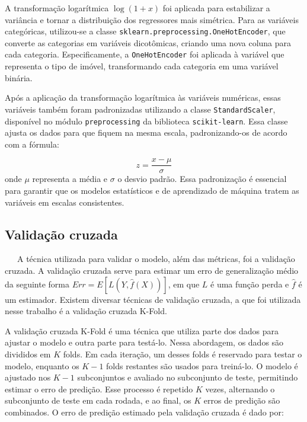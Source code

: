 \documentclass[
  12pt,
  a4paper,
]{scrreprt}
\begin{document}
\vspace{12pt}

A transformação logarítmica \(\log(1 + x)\) foi aplicada para
estabilizar a variância e tornar a distribuição dos regressores mais
simétrica. Para as variáveis categóricas, utilizou-se a classe
\texttt{sklearn.preprocessing.OneHotEncoder}, que converte as categorias
em variáveis dicotômicas, criando uma nova coluna para cada categoria.
Especificamente, a \texttt{OneHotEncoder} foi aplicada à variável que
representa o tipo de imóvel, transformando cada categoria em uma
variável binária.

\vspace{12pt}

Após a aplicação da transformação logarítmica às variáveis numéricas,
essas variáveis também foram padronizadas utilizando a classe
\texttt{StandardScaler}, disponível no módulo \texttt{preprocessing} da
biblioteca \texttt{scikit-learn}. Essa classe ajusta os dados para que
fiquem na mesma escala, padronizando-os de acordo com a fórmula:

\[
z = \frac{x - \mu}{\sigma}
\] onde \(\mu\) representa a média e \(\sigma\) o desvio padrão. Essa
padronização é essencial para garantir que os modelos estatísticos e de
aprendizado de máquina tratem as variáveis em escalas consistentes.

\subsection{Validação cruzada}\label{validauxe7uxe3o-cruzada}

~~~A técnica utilizada para validar o modelo, além das métricas, foi a
validação cruzada. A validação cruzada serve para estimar um erro de
generalização médio da seguinte forma
\(Err = E\left[L\left(Y, \hat{f}\left(X\right)\right)\right]\), em que
\(L\) é uma função perda e \(\hat f\) é um estimador. Existem diversar
técnicas de validação cruzada, a que foi utilizada nesse trabalho é a
validação cruzada K-Fold.

\vspace{12pt}

A validação cruzada K-Fold é uma técnica que utiliza parte dos dados
para ajustar o modelo e outra parte para testá-lo. Nessa abordagem, os
dados são divididos em \(K\) folds. Em cada iteração, um desses folds é
reservado para testar o modelo, enquanto os \(K−1\) folds restantes são
usados para treiná-lo. O modelo é ajustado nos \(K−1\) subconjuntos e
avaliado no subconjunto de teste, permitindo estimar o erro de predição.
Esse processo é repetido \(K\) vezes, alternando o subconjunto de teste
em cada rodada, e ao final, os \(K\) erros de predição são combinados. O
erro de predição estimado pela validação cruzada é dado por:
\end{document}
